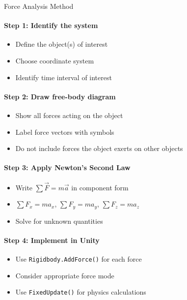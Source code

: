\begin{KR}{Force Analysis Method}\\
    \paragraph{Step 1: Identify the system}
    \begin{itemize}
        \item Define the object(s) of interest
        \item Choose coordinate system
        \item Identify time interval of interest
    \end{itemize}
    
    \paragraph{Step 2: Draw free-body diagram}
    \begin{itemize}
        \item Show all forces acting on the object
        \item Label force vectors with symbols
        \item Do not include forces the object exerts on other objects
    \end{itemize}
    
    \paragraph{Step 3: Apply Newton's Second Law}
    \begin{itemize}
        \item Write $\sum \vec{F} = m\vec{a}$ in component form
        \item $\sum F_x = ma_x$, $\sum F_y = ma_y$, $\sum F_z = ma_z$
        \item Solve for unknown quantities
    \end{itemize}
    
    \paragraph{Step 4: Implement in Unity}
    \begin{itemize}
        \item Use \texttt{Rigidbody.AddForce()} for each force
        \item Consider appropriate force mode
        \item Use \texttt{FixedUpdate()} for physics calculations
    \end{itemize}
\end{KR}

